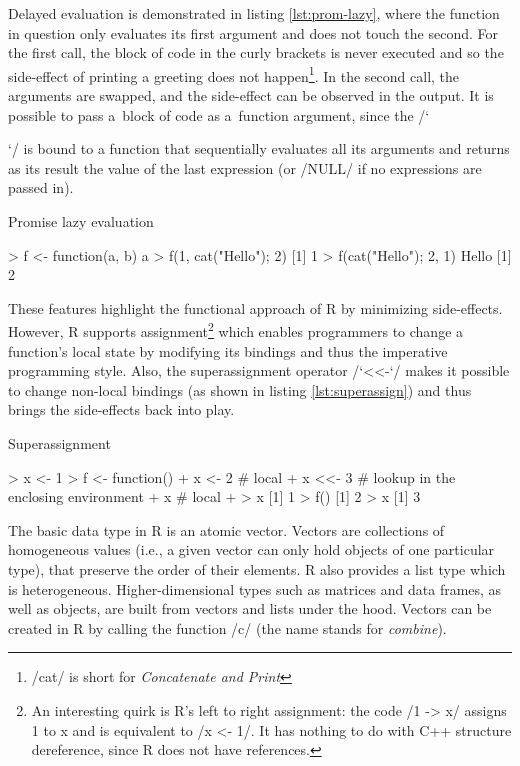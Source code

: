 Delayed evaluation is demonstrated in listing \ref{lst:prom-lazy}, where the function in question only evaluates its first argument and does not touch the second. For the first call, the block of code in the curly brackets is never executed and so the side-effect of printing a greeting does not happen\footnote{\rinline/cat/ is short for \emph{Concatenate and Print}}. In the second call, the arguments are swapped, and the side-effect can be observed in the output. It is possible to pass a~block of code as a~function argument, since the \rinline/`{`/ is bound to a function that sequentially evaluates all its arguments and returns as its result the value of the last expression (or \rinline/NULL/ if no expressions are passed in).

\begin{listing}[htbp]
  \caption{\label{lst:prom-lazy}Promise lazy evaluation}
  \begin{rcode}
> f <- function(a, b) a
> f(1, {cat("Hello\n"); 2})
[1] 1
> f({cat("Hello\n"); 2}, 1)
Hello
[1] 2
  \end{rcode}
\end{listing}

These features highlight the functional approach of R by minimizing side-effects. However, R supports assignment\footnote{An interesting quirk is R's left to right assignment: the code \rinline/1 -> x/ assigns 1 to x and is equivalent to \rinline/x <- 1/. It has nothing to do with C++ structure dereference, since R does not have references.} which enables programmers to change a function's local state by modifying its bindings and thus the imperative programming style. Also, the superassignment operator \rinline/`<<-`/ makes it possible to change non-local bindings (as shown in listing \ref{lst:superassign}) and thus brings the side-effects back into play.

\begin{listing}[htbp]
  \caption{\label{lst:superassign}Superassignment}
  \begin{rcode}
> x <- 1
> f <- function() {
+     x <- 2  # local
+     x <<- 3  # lookup in the enclosing environment
+     x  # local
+ }
> x
[1] 1
> f()
[1] 2
> x
[1] 3
  \end{rcode}
\end{listing}

The basic data type in R is an atomic vector. Vectors are collections of homogeneous values (i.e., a given vector can only hold objects of one particular type), that preserve the order of their elements. R also provides a list type which is heterogeneous. Higher-dimensional types such as matrices and data frames, as well as objects, are built from vectors and lists under the hood. Vectors can be created in R by calling the function \rinline/c/ (the name stands for \emph{combine}).

}
